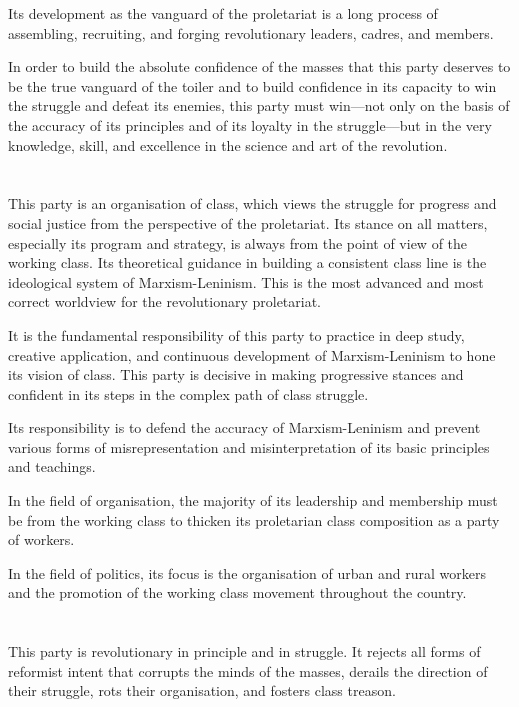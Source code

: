 \documentclass[a4paper,11pt,onesided]{report}
\begin{document}
Its development as the vanguard of the proletariat 
is a long process of assembling, recruiting, and forging 
revolutionary leaders, cadres, and members.

In order to build the absolute confidence of the masses 
that this party deserves to be 
the true vanguard of the toiler and 
to build confidence in its capacity to win the struggle 
and defeat its enemies, 
this party must win---not only 
on the basis of the accuracy of its principles 
and of its loyalty in the struggle---but 
in the very knowledge, skill, and excellence 
in the science and art of the revolution. 


\section{}
This party is an organisation of class,
which views the struggle 
for progress and social justice 
from the perspective of the proletariat. 
Its stance on all matters, 
especially its program and strategy, 
is always from the point of view of the working class. 
Its theoretical guidance 
in building a consistent class line 
is the ideological system of Marxism-Leninism. 
This is the most advanced and most correct worldview 
for the revolutionary proletariat.

It is the fundamental responsibility of this party 
to practice in deep study, 
creative application, 
and continuous development 
of Marxism-Leninism to hone its vision of class. 
This party is decisive in making progressive stances 
and confident in its steps in the complex path of class struggle.

Its responsibility is to defend the accuracy of Marxism-Leninism 
and prevent various forms of misrepresentation and misinterpretation 
of its basic principles and teachings.

In the field of organisation, 
the majority of its leadership and membership
must be from the working class 
to thicken its proletarian class composition 
as a party of workers.

In the field of politics, 
its focus is the organisation 
of urban and rural workers 
and the promotion of the working class movement 
throughout the country.


\section{}
This party is revolutionary in principle and in struggle. 
It rejects all forms of reformist intent 
that corrupts the minds of the masses, 
derails the direction of their struggle, 
rots their organisation,
and fosters class treason.
\end{document}
